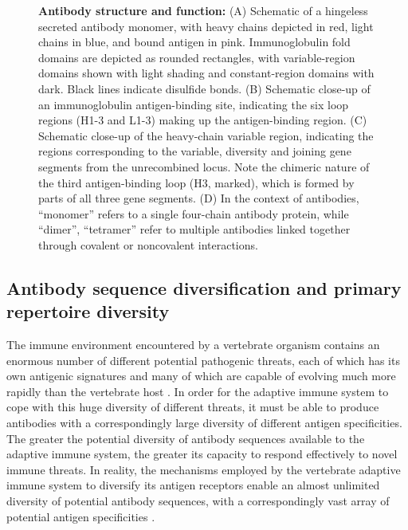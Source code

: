 \begin{figure}
\caption[Antibody structure and function]{\textbf{Antibody structure and function:} (A) Schematic of a hingeless secreted antibody monomer, with heavy chains depicted in red, light chains in blue, and bound antigen in pink. Immunoglobulin fold domains are depicted as rounded rectangles, with variable-region domains shown with light shading and constant-region domains with dark. Black lines indicate disulfide bonds. (B) Schematic close-up of an immunoglobulin antigen-binding site, indicating the six loop regions (H1-3 and L1-3) making up the antigen-binding region. (C) Schematic close-up of the heavy-chain variable region, indicating the regions corresponding to the variable, diversity and joining gene segments from the unrecombined \igh{} locus. Note the chimeric nature of the third antigen-binding loop (H3, marked), which is formed by parts of all three gene segments. (D) In the context of antibodies, ``monomer'' refers to a single four-chain antibody protein, while ``dimer'', ``tetramer'' \etc refer to multiple antibodies linked together through covalent or noncovalent interactions.}
\label{fig:intro-antibody-structure}
\end{figure}

\subsection{Antibody sequence diversification and primary repertoire diversity}
\label{sec:intro_immunity_primary}

The immune environment encountered by a vertebrate organism contains an enormous number of different potential pathogenic threats, each of which has its own antigenic signatures and many of which are capable of evolving much more rapidly than the vertebrate host \parencite{jack2015evolution}. In order for the adaptive immune system to cope with this huge diversity of different threats, it must be able to produce antibodies with a correspondingly large diversity of different antigen specificities. The greater the potential diversity of antibody sequences available to the adaptive immune system, the greater its capacity to respond effectively to novel immune threats. In reality, the mechanisms employed by the vertebrate adaptive immune system to diversify its antigen receptors enable an almost unlimited diversity of potential antibody sequences, with a correspondingly vast array of potential antigen specificities \parencite{mora2016quantifying}.

